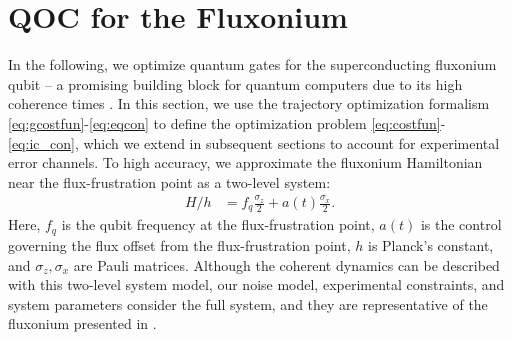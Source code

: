 \section{QOC for the Fluxonium \label{sec:fluxonium}}
In the following, we optimize quantum gates
for the superconducting fluxonium qubit -- a promising
building block for quantum computers due to its high
coherence times
\cite{earnest2018realization, lin2018demonstration,
  manucharyan2009fluxonium, somoroff2021millisecond, nguyen2019high,
  zhang2020universal}.
In this section, we use the trajectory optimization
formalism \eqref{eq:gcostfun}-\eqref{eq:eqcon}
to define the optimization problem \eqref{eq:costfun}-\eqref{eq:ic_con},
which we extend in subsequent sections to account
for experimental error channels.
To high accuracy, we approximate the fluxonium Hamiltonian near the flux-frustration
point as a two-level system:
\begin{align}
  H/h &= f_{q} \frac{\sigma_{z}}{2} + a(t) \frac{\sigma_{x}}{2}.
  \label{eq:hamiltonian}
\end{align}
Here, $f_{q}$ is the qubit frequency at the flux-frustration point,
$a(t)$ is the control governing the flux offset from the flux-frustration point,
$h$ is Planck's constant, and $\sigma_{z}, \sigma_{x}$
are Pauli matrices. Although the coherent dynamics can be described with this two-level
system model, our noise model, experimental constraints, and system parameters
consider the full system, and they are representative of the fluxonium
presented in \cite{zhang2020universal}.

